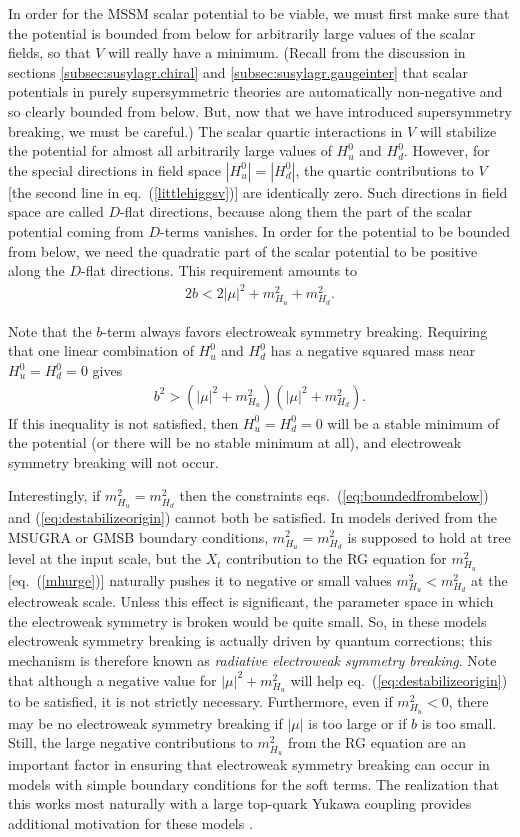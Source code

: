 \documentclass[12pt]{article}
\def\beq{\begin{eqnarray}}
\def\eeq{\end{eqnarray}}
\begin{document}
In order for the MSSM scalar potential to be viable, we must first make 
sure that the potential is bounded from below for arbitrarily large values 
of the scalar fields, so that $V$ will really have a minimum. (Recall from 
the discussion in sections \ref{subsec:susylagr.chiral} and 
\ref{subsec:susylagr.gaugeinter} that scalar potentials in purely 
supersymmetric theories are automatically non-negative and so clearly 
bounded from below. But, now that we have introduced supersymmetry 
breaking, we must be careful.) The scalar quartic interactions in $V$ will 
stabilize the potential for almost all arbitrarily large values of $H_u^0$ 
and $H_d^0$. However, for the special directions in field space $|H_u^0| = 
|H_d^0|$, the quartic contributions to $V$ [the second line in 
eq.~(\ref{littlehiggsv})] are identically zero. Such directions in field 
space are called $D$-flat directions, because along them the part of the 
scalar potential coming from $D$-terms vanishes. In order for the 
potential to be bounded from below, we need the quadratic part of the 
scalar potential to be positive along the $D$-flat directions. This 
requirement amounts to
\beq
2 b < 2 |\mu |^2 + m^2_{H_u} + m^2_{H_d}.
\label{eq:boundedfrombelow}
\eeq

Note that the $b$-term always favors electroweak symmetry breaking. 
Requiring that one linear combination of $H_u^0$ and $H_d^0$ has a 
negative squared mass near $H_u^0=H_d^0=0$ gives
\beq
b^2 > (|\mu|^2 + m^2_{H_u} )(|\mu|^2 + m^2_{H_d}).
\label{eq:destabilizeorigin}
\eeq
If this inequality is not satisfied, then $H_u^0 = H_d^0 = 0$ will be a 
stable minimum of the potential (or there will be no stable minimum at 
all), and electroweak symmetry breaking will not occur.

Interestingly, if $m_{H_u}^2 = m_{H_d}^2$ then the constraints 
eqs.~(\ref{eq:boundedfrombelow}) and (\ref{eq:destabilizeorigin}) cannot 
both be satisfied. In models derived from the MSUGRA or 
GMSB boundary conditions, $m_{H_u}^2 = m_{H_d}^2$ is supposed to 
hold at tree level at the input scale, but the $X_t$ contribution to the 
RG equation for $m_{H_u}^2$ [eq.~(\ref{mhurge})] naturally pushes it to 
negative or small values $m_{H_u}^2 < m_{H_d}^2$ at the electroweak scale. 
Unless this effect is significant, the parameter space in which the 
electroweak symmetry is broken would be quite small. So, in these models 
electroweak symmetry breaking is actually driven by quantum corrections; 
this mechanism is therefore known as {\it radiative electroweak symmetry 
breaking}. Note that although a negative value for $|\mu|^2 + m_{H_u}^2$ 
will help eq.~(\ref{eq:destabilizeorigin}) to be satisfied, it is not 
strictly necessary. Furthermore, even if $m_{H_u}^2<0$, there may be no 
electroweak symmetry breaking if $|\mu|$ is too large or if $b$ is too 
small. Still, the large negative contributions to $m_{H_u}^2$ from the RG 
equation are an important factor in ensuring that electroweak symmetry 
breaking can occur in models with simple boundary conditions for the soft 
terms. The realization that this works most naturally with a large 
top-quark Yukawa coupling provides additional motivation for these models 
\cite{rewsbone,rewsbtwo}.
\end{document}
